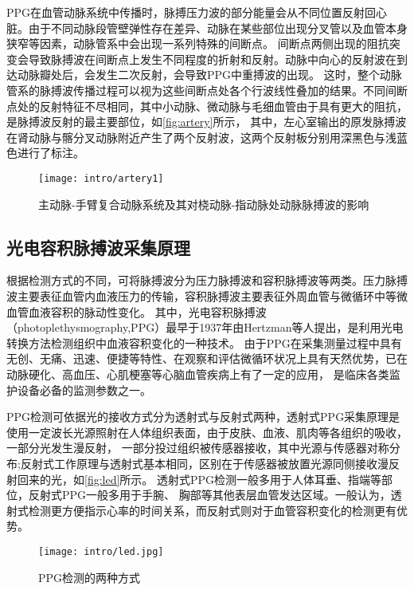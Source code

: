 PPG在血管动脉系统中传播时，脉搏压力波的部分能量会从不同位置反射回心脏。由于不同动脉段管壁弹性存在差异、动脉在某些部位出现分叉管以及血管本身狭窄等因素，动脉管系中会出现一系列特殊的间断点。
间断点两侧出现的阻抗突变会导致脉搏波在间断点上发生不同程度的折射和反射。动脉中向心的反射波在到达动脉瓣处后，会发生二次反射，会导致PPG中重搏波的出现。
这时，整个动脉管系的脉搏波传播过程可以视为这些间断点处各个行波线性叠加的结果\cite{THOCBPM}。不同间断点处的反射特征不尽相同，其中小动脉、微动脉与毛细血管由于具有更大的阻抗，是脉搏波反射的最主要部位，如\autoref{fig:artery}所示，
其中，左心室输出的原发脉搏波在肾动脉与髂分叉动脉附近产生了两个反射波，这两个反射板分别用深黑色与浅蓝色进行了标注。
\begin{figure}[htbp]
    \centering
    \texttt{[image: intro/artery1]}
    \caption[主动脉-手臂复合动脉系统及其对桡动脉-指动脉处动脉脉搏波的影响示意图]{\label{fig:artery}主动脉-手臂复合动脉系统及其对桡动脉-指动脉处动脉脉搏波的影响\cite{THOCBPM}}
\end{figure}

\subsection{光电容积脉搏波采集原理}
根据检测方式的不同，可将脉搏波分为压力脉搏波和容积脉搏波等两类。压力脉搏波主要表征血管内血液压力的传输，容积脉搏波主要表征外周血管与微循环中等微血管血液容积的脉动性变化。
其中，光电容积脉搏波（photoplethysmography,PPG）最早于1937年由Hertzman等人\cite{Hertzman1937}提出，是利用光电转换方法检测组织中血液容积变化的一种技术。
由于PPG在采集测量过程中具有无创、无痛、迅速、便捷等特性、在观察和评估微循环状况上具有天然优势，已在动脉硬化、高血压、心肌梗塞等心脑血管疾病上有了一定的应用，
是临床各类监护设备必备的监测参数之一\cite{PPGYY,Allen2007,THOCBPM,Zhang2010,ldl,lhc}。

PPG检测可依据光的接收方式分为透射式与反射式两种\cite{THOCBPM}，透射式PPG采集原理是使用一定波长光源照射在人体组织表面，由于皮肤、血液、肌肉等各组织的吸收，一部分光发生漫反射，
一部分投过组织被传感器接收，其中光源与传感器对称分布;反射式工作原理与透射式基本相同，区别在于传感器被放置光源同侧接收漫反射回来的光\cite{THOCBPM,mmt}，如\autoref{fig:led}所示。
透射式PPG检测一般多用于人体耳垂、指端等部位，反射式PPG一般多用于手腕、
胸部等其他表层血管发达区域\cite{THOCBPM}。一般认为，透射式检测更方便指示心率的时间关系，而反射式则对于血管容积变化的检测更有优势\cite{mmt}。
\begin{figure}[htbp]
    \centering
    \texttt{[image: intro/led.jpg]}
    \caption[PPG检测的两种方式]{\label{fig:led}PPG检测的两种方式\cite{THOCBPM}}
\end{figure}

